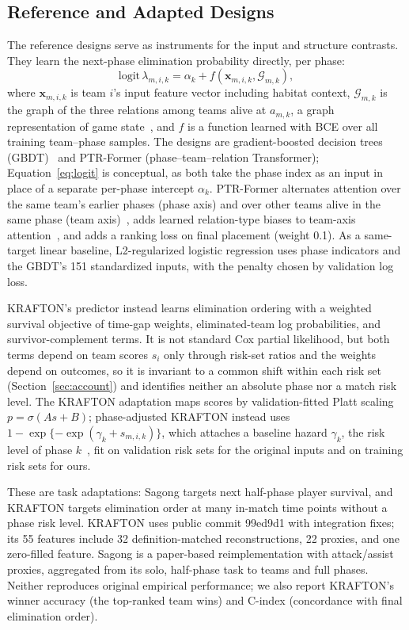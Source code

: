 \documentclass[sigconf,anonymous]{acmart}
\begin{document}
\subsection{Reference and Adapted Designs}
\label{sec:method:rq2}
The reference designs serve as instruments for the input and structure contrasts. They learn the next-phase elimination probability directly, per phase:
\begin{equation}
\mathrm{logit}\,\lambda_{m,i,k}=\alpha_k+f(\mathbf{x}_{m,i,k},\mathcal{G}_{m,k}),
\label{eq:logit}
\end{equation}
where $\mathbf{x}_{m,i,k}$ is team $i$'s input feature vector including habitat context, $\mathcal{G}_{m,k}$ is the graph of the three relations among teams alive at $a_{m,k}$, a graph representation of game state~\cite{Xenopoulos21}, and $f$ is a function learned with BCE over all training team--phase samples. The designs are gradient-boosted decision trees (GBDT)~\cite{Friedman01} and PTR-Former (phase--team--relation Transformer); Equation~\eqref{eq:logit} is conceptual, as both take the phase index as an input in place of a separate per-phase intercept $\alpha_k$. PTR-Former alternates attention over the same team's earlier phases (phase axis) and over other teams alive in the same phase (team axis)~\cite{Vaswani17,Ngiam22}, adds learned relation-type biases to team-axis attention~\cite{Ying21}, and adds a ranking loss on final placement (weight 0.1). As a same-target linear baseline, L2-regularized logistic regression uses phase indicators and the GBDT's 151 standardized inputs, with the penalty chosen by validation log loss.

KRAFTON's predictor instead learns elimination ordering with a weighted survival objective of time-gap weights, eliminated-team log probabilities, and survivor-complement terms. It is not standard Cox partial likelihood, but both terms depend on team scores $s_i$ only through risk-set ratios and the weights depend on outcomes, so it is invariant to a common shift within each risk set (Section~\ref{sec:account}) and identifies neither an absolute phase nor a match risk level. The KRAFTON adaptation maps scores by validation-fitted Platt scaling $p=\sigma(A s+B)$; phase-adjusted KRAFTON instead uses $1-\exp\{-\exp(\gamma_k+s_{m,i,k})\}$, which attaches a baseline hazard $\gamma_k$, the risk level of phase $k$~\cite{PrenticeGloeckler78}, fit on validation risk sets for the original inputs and on training risk sets for ours.

These are task adaptations: Sagong targets next half-phase player survival, and KRAFTON targets elimination order at many in-match time points without a phase risk level. KRAFTON uses public commit 99ed9d1 with integration fixes; its 55 features include 32 definition-matched reconstructions, 22 proxies, and one zero-filled feature. Sagong is a paper-based reimplementation with attack/assist proxies, aggregated from its solo, half-phase task to teams and full phases. Neither reproduces original empirical performance; we also report KRAFTON's winner accuracy (the top-ranked team wins) and C-index (concordance with final elimination order).
\end{document}
